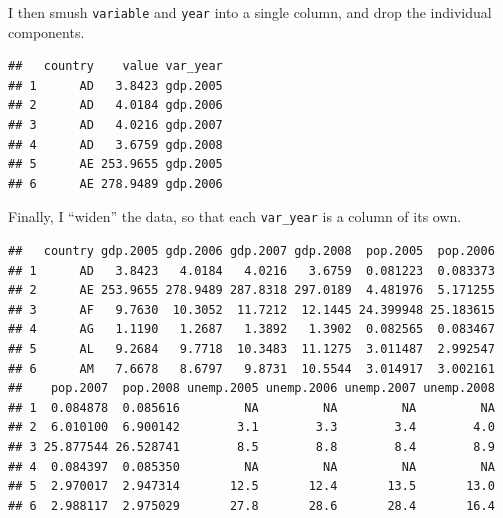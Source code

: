 \documentclass[12pt,oneside,openany]{book}
\newenvironment{Shaded}{\begin{snugshade}}{\end{snugshade}}
\newcommand{\KeywordTok}[1]{\textcolor[rgb]{0.13,0.29,0.53}{\textbf{#1}}}
\newcommand{\DataTypeTok}[1]{\textcolor[rgb]{0.13,0.29,0.53}{#1}}
\newcommand{\StringTok}[1]{\textcolor[rgb]{0.31,0.60,0.02}{#1}}
\newcommand{\OperatorTok}[1]{\textcolor[rgb]{0.81,0.36,0.00}{\textbf{#1}}}
\newcommand{\NormalTok}[1]{#1}
\begin{document}
I then smush \texttt{variable} and \texttt{year} into a single column,
and drop the individual components.

\begin{Shaded}
\end{Shaded}

\begin{verbatim}
##   country    value var_year
## 1      AD   3.8423 gdp.2005
## 2      AD   4.0184 gdp.2006
## 3      AD   4.0216 gdp.2007
## 4      AD   3.6759 gdp.2008
## 5      AE 253.9655 gdp.2005
## 6      AE 278.9489 gdp.2006
\end{verbatim}

Finally, I ``widen'' the data, so that each \texttt{var\_year} is a
column of its own.

\begin{Shaded}
\end{Shaded}

\begin{verbatim}
##   country gdp.2005 gdp.2006 gdp.2007 gdp.2008  pop.2005  pop.2006
## 1      AD   3.8423   4.0184   4.0216   3.6759  0.081223  0.083373
## 2      AE 253.9655 278.9489 287.8318 297.0189  4.481976  5.171255
## 3      AF   9.7630  10.3052  11.7212  12.1445 24.399948 25.183615
## 4      AG   1.1190   1.2687   1.3892   1.3902  0.082565  0.083467
## 5      AL   9.2684   9.7718  10.3483  11.1275  3.011487  2.992547
## 6      AM   7.6678   8.6797   9.8731  10.5544  3.014917  3.002161
##    pop.2007  pop.2008 unemp.2005 unemp.2006 unemp.2007 unemp.2008
## 1  0.084878  0.085616         NA         NA         NA         NA
## 2  6.010100  6.900142        3.1        3.3        3.4        4.0
## 3 25.877544 26.528741        8.5        8.8        8.4        8.9
## 4  0.084397  0.085350         NA         NA         NA         NA
## 5  2.970017  2.947314       12.5       12.4       13.5       13.0
## 6  2.988117  2.975029       27.8       28.6       28.4       16.4
\end{verbatim}
\end{document}
